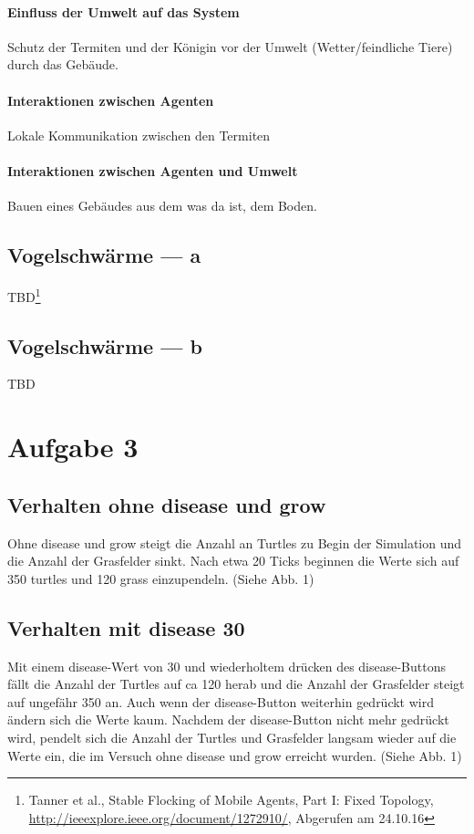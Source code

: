 \documentclass[10pt]{article}%
\theoremstyle{nonumberplain}
\begin{document}
\paragraph{Einfluss der Umwelt auf das System}
Schutz der Termiten und der Königin vor der Umwelt (Wetter/feindliche Tiere) durch das Gebäude.
\paragraph{Interaktionen zwischen Agenten}
Lokale Kommunikation zwischen den Termiten
\paragraph{Interaktionen zwischen Agenten und Umwelt}
Bauen eines Gebäudes aus dem was da ist, dem Boden.
\subsection{Vogelschwärme --- a}
TBD\footnote{Tanner et al., Stable Flocking of Mobile Agents, Part I: Fixed
	Topology, \url{http://ieeexplore.ieee.org/document/1272910/}, Abgerufen am 24.10.16}
\subsection{Vogelschwärme --- b}
TBD
\section{Aufgabe 3}

\subsection{Verhalten ohne disease und grow}
Ohne disease und grow steigt die Anzahl an Turtles zu Begin der Simulation und die Anzahl der Grasfelder sinkt. Nach etwa 20 Ticks beginnen die Werte sich auf 350 turtles und 120 grass einzupendeln. (Siehe Abb. 1) 


\subsection{Verhalten mit disease 30}
Mit einem disease-Wert von 30 und wiederholtem drücken des disease-Buttons fällt die Anzahl der Turtles auf ca 120 herab und die Anzahl der Grasfelder steigt auf ungefähr 350 an. Auch wenn der disease-Button weiterhin gedrückt wird ändern sich die Werte kaum. Nachdem der disease-Button nicht mehr gedrückt wird, pendelt sich die Anzahl der Turtles und Grasfelder langsam wieder auf die Werte ein, die im Versuch ohne disease und grow erreicht wurden. (Siehe Abb. 1)  
\end{document}
